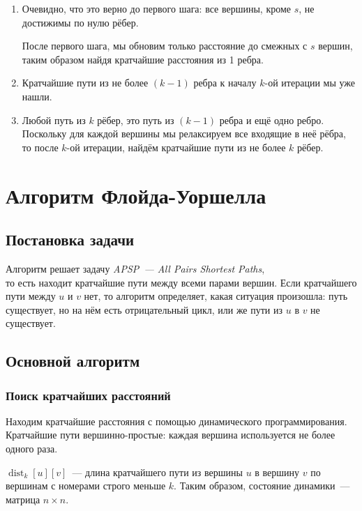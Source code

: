 \documentclass[a4paper,12pt]{article}
\DeclareMathOperator{\dist}{dist}
\begin{document}
    \noindent\begin{minipage}{\textwidth}
    \begin{enumerate}
      \item Очевидно, что это верно до первого шага: все вершины, кроме $s$,
      не достижимы по нулю рёбер.    

      После первого шага, мы обновим только расстояние до смежных с $s$ вершин,
      таким образом найдя кратчайшие расстояния из 1 ребра.
    
      \item Кратчайшие пути из не более $(k - 1)$ ребра к началу $k$-ой итерации
            мы уже нашли.
      \item Любой путь из $k$ рёбер, это путь из $(k - 1)$ ребра и ещё одно ребро.
            Поскольку для каждой вершины мы релаксируем все входящие в неё рёбра,
            то после $k$-ой итерации, найдём кратчайшие пути из не более $k$ рёбер.
    \end{enumerate}
    \end{minipage}

  \section{Алгоритм Флойда-Уоршелла}

    \subsection{Постановка задачи}
    Алгоритм решает задачу \emph{APSP~--- All Pairs Shortest Paths},\\
    то есть находит кратчайшие пути между всеми парами вершин.
    Если кратчайшего пути между $u$ и $v$ нет, то алгоритм определяет,
    какая ситуация произошла: путь существует, но на нём есть отрицательный цикл,
    или же пути из $u$ в $v$ не существует.

    \subsection{Основной алгоритм}
      \subsubsection{Поиск кратчайших расстояний}
      Находим кратчайшие расстояния с помощью динамического программирования.
      Кратчайшие пути вершинно-простые: каждая вершина используется не более
      одного раза.
      
      $\dist_k[u][v]$~--- длина кратчайшего пути из вершины $u$
      в вершину $v$ по вершинам с номерами строго меньше $k$.
      Таким образом, состояние динамики~--- матрица $n \times n$.
      
\end{document}
